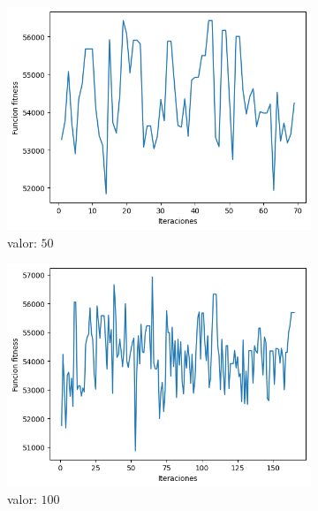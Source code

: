 \documentclass[a4paper,12pt]{article}
\begin{document}
	\begin{figure}[H]
		\centering
		\begin{subfigure}{0.24\textwidth}
			\centering
			\includegraphics[width=\textwidth]{include/parada/50/f.png}
			\caption{valor: $50$}
		\end{subfigure}
		\hfill
		\begin{subfigure}{0.24\textwidth}
			\centering
			\includegraphics[width=\textwidth]{include/parada/100/f.png}
			\caption{valor: $100$}
		\end{subfigure}
		\hfill
		\begin{subfigure}{0.24\textwidth}
			\centering

\end{subfigure}
\end{figure}
\end{document}
